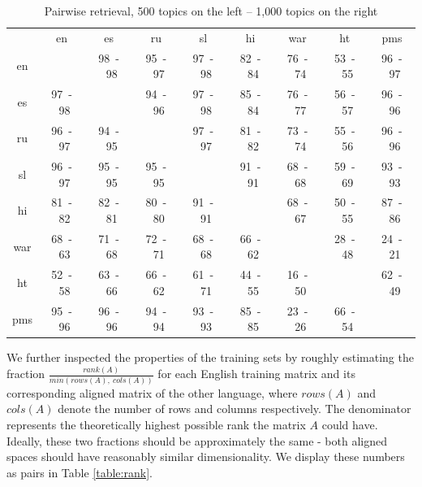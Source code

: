 {
\renewcommand\tabcolsep{3pt}
\begin{table}[t]
\begin{center}
\begin{tabular}{|c|c|c|c|c|c|c|c|c|}
\cline{1-9}
&	en&	es&	ru&	sl&	hi&	war&	ht&	pms\\\cline{1-9}
en&	    &	98~-~98&	95~-~97&	97~-~98&	82~-~84&	76~-~74&	53~-~55&	 96~-~97\\
\cline{1-9}
es&	97~-~98&	&	94~-~96&	97~-~98&	85~-~84&	76~-~77&	56~-~57&	96~-~96\\
\cline{1-9}
ru&	96~-~97&	94~-~95&	&	97~-~97&	81~-~82&	73~-~74&	55~-~56&	96~-~96\\
\cline{1-9}
sl&	96~-~97&	95~-~95&	95~-~95&	&	91~-~91&	68~-~68&	59~-~69&	93~-~93\\
\cline{1-9}
hi&	81~-~82&	82~-~81&	80~-~80&	91~-~91&	&	68~-~67&	50~-~55&	87~-~86\\
\cline{1-9}
war&	68~-~63&	71~-~68&	72~-~71&	68~-~68&	66~-~62&	&	28~-~48&	 24~-~21\\
\cline{1-9}
ht&	52~-~58&	63~-~66&	66~-~62&	61~-~71&	44~-~55&	16~-~50&	&	62~-~49\\
\cline{1-9}
pms&	95~-~96&	96~-~96&	94~-~94&	93~-~93&	85~-~85&	23~-~26&	66~-~54&	 \\
\cline{1-9}
\end{tabular}
\caption{Pairwise retrieval, 500 topics on the left -- 1,000 topics on the right}\label{table:retrieval}
\end{center}
\end{table}
}

We further inspected the properties of the training sets by roughly estimating the fraction 
$\frac{rank(A)}{min\left(rows\left(A\right),~cols\left(A\right)\right)}$ for each English 
training matrix and its corresponding aligned matrix of the other language, where $rows(A)$ and $cols(A)$ 
denote the number of rows and columns respectively. The denominator represents the theoretically 
highest possible rank the matrix $A$ could have. Ideally, these two fractions should be 
approximately the same - both aligned spaces should have reasonably similar dimensionality. 
We display these numbers as pairs in Table \ref{table:rank}.

